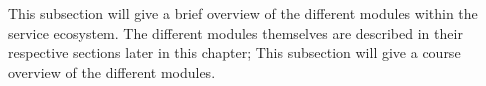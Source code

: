 \label{ssec:Modules}
This subsection will give a brief overview of the different modules within the service ecosystem. The different modules themselves are described in their respective sections later in this chapter; This subsection will give a course overview of the different modules.







